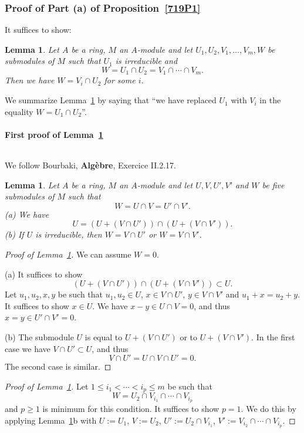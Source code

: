 \documentclass[parskip=half,fontsize=12pt]{scrartcl}%
\newtheorem{lem}[thm]{Lemma}
\begin{document}
\subsubsection{Proof of Part (a) of Proposition~\ref{719P1}}%

It suffices to show:

\begin{lem}\label{719L2}
Let $A$ be a ring, $M$ an $A$-module and let $U_1,U_2,V_1,\dots,V_m,W$ be submodules of $M$ such that $U_1$ is irreducible and 
$$
W=U_1\cap U_2=V_1\cap\cdots\cap V_m.
$$ 
Then we have $W=V_i\cap U_2$ for some $i$. 
\end{lem} 

We summarize Lemma~\ref{719L2} by saying that ``we have replaced $U_1$ with $V_i$ in the equality $W=U_1\cap U_2$''. 

\paragraph{First proof of Lemma~\ref{719L2}}${}$\medskip%

We follow Bourbaki, \textbf{Algèbre}, Exercice II.2.17.

\begin{lem}\label{719L3}
Let $A$ be a ring, $M$ an $A$-module and let $U,V,U',V'$ and $W$ be five submodules of $M$ such that 
$$
W=U\cap V=U'\cap V'.
$$ 
(a) We have 
$$
U=(U+(V\cap U'))\cap(U+(V\cap V')).
$$ 
(b) If $U$ is irreducible, then $W=V\cap U'$ or $W=V\cap V'$. 
\end{lem} 
\begin{proof}[Proof of Lemma~\ref{719L3}] We can assume $W=0$. 

(a) It suffices to show 
$$
(U+(V\cap U'))\cap(U+(V\cap V'))\subset U. 
$$ 
Let $u_1,u_2,x,y$ be such that $u_1,u_2\in U$, $x\in V\cap U'$, $y\in V\cap V'$ and $u_1+x=u_2+y$. It suffices to show $x\in U$. We have $x-y\in U\cap V=0$, and thus $x=y\in U'\cap V'=0$. 

(b) The submodule $U$ is equal to $U+(V\cap U')$ or to $U+(V\cap V')$. In the first case we have $V\cap U'\subset U$, and thus 
$$
V\cap U'=U\cap V\cap U'=0. 
$$ 
The second case is similar. 
\end{proof} 

\begin{proof}[Proof of Lemma~\ref{719L2}] Let $1\le i_1<\cdots<i_p\le m$ be such that 
$$
W=U_2\cap V_{i_1}\cap\cdots\cap V_{i_p}
$$ 
and $p\ge1$ is minimum for this condition. It suffices to show $p=1$. We do this by applying Lemma~\ref{719L3}b with $U:=U_1$, $V:=U_2$, $U':=U_2\cap V_{i_1}$, $V':=V_{i_2}\cap\cdots\cap V_{i_p}$. 
\end{proof}
\end{document}
